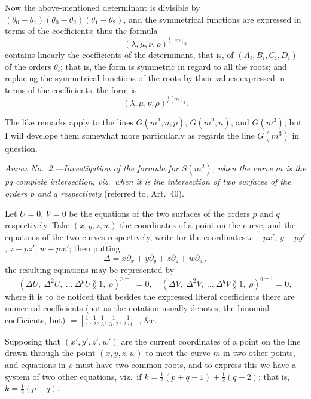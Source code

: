 \documentclass[11pt,a4paper]{article}
\begin{document}
\medskip

\noindent Now the above-mentioned determinant is divisible by $(\theta_0 - \theta_1)(\theta_0 - \theta_2)(\theta_1 - \theta_2)$, and the symmetrical functions are expressed in terms of the coefficients; thus the formula
\[
(\lambda, \mu, \nu, \rho)^{\frac{1}{6}[m]_3}
\]
contains linearly the coefficients of the determinant, that is, of $(A_i, B_i, C_i, D_i)$ of the orders $\theta_i$; that is, the form is symmetric in regard to all the roots; and replacing the symmetrical functions of the roots by their values expressed in terms of the coefficients, the form is
\[
(\lambda, \mu, \nu, \rho)^{\frac{1}{6}[m]_3}.
\]

\medskip

\noindent The like remarks apply to the lines $G(m^2, n, p)$, $G(m^2, n)$, and $G(m^3)$; but I will develope them somewhat more particularly as regards the line $G(m^3)$ in question.

\medskip

\noindent \textit{Annex No.\ 2.---Investigation of the formula for $S(m^2)$, when the curve $m$ is the pq complete intersection, viz.\ when it is the intersection of two surfaces of the orders $p$ and $q$ respectively} (referred to, Art.\ 40).

\medskip

\noindent Let $U=0$, $V=0$ be the equations of the two surfaces of the orders $p$ and $q$ respectively. Take $(x, y, z, w)$ the coordinates of a point on the curve, and the equations of the two curves respectively, write for the coordinates $x+px'$, $y+py'$, $z+pz'$, $w+pw'$; then putting
\[
\Delta = x\partial_x + y\partial_y + z\partial_z + w\partial_w,
\]
the resulting equations may be represented by
\[
(\Delta U,\ \Delta^2 U,\ \ldots\ \Delta^p U\!\between\!1,\ \rho)^{p-1} = 0,\quad (\Delta V,\ \Delta^2 V,\ \ldots\ \Delta^q V\!\between\!1,\ \rho)^{q-1} = 0,
\]
where it is to be noticed that besides the expressed literal coefficients there are numerical coefficients (not as the notation usually denotes, the binomial coefficients, but) $= [\frac{1}{1}, \frac{1}{2}, \frac{1}{3}, \frac{1}{3 \cdot 2}, \frac{1}{2 \cdot 1}]$, \&c.

\medskip

\noindent Supposing that $(x', y', z', w')$ are the current coordinates of a point on the line drawn through the point $(x, y, z, w)$ to meet the curve $m$ in two other points, and equations in $\rho$ must have two common roots, and to express this we have a system of two other equations, viz.\ if $k=\frac{1}{2}(p+q-1)+\frac{1}{2}(q-2)$; that is, $k=\frac{1}{2}(p+q)$.
\end{document}
